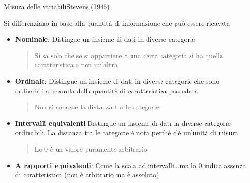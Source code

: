 \documentclass[compress]{beamer}
\begin{document}
\begin{frame}{Misura delle variabili}{Stevens (1946)}
	
	\small
	Si differenziano in base alla quantità di informazione che può essere ricavata
	
	\begin{itemize}
	\item \textbf{Nominale}: Distingue un insieme di dati in diverse categorie
	\begin{quote}
		Si sa solo che se si appartiene a una certa categoria si ha quella caratteristica e non un'altra
	\end{quote}
	\item \textbf{Ordinale}: Distingue un insieme di dati in diverse categorie che sono ordinabili a seconda della quantità di caratteristica posseduta 
	\begin{quote}
		Non si conosce la distanza tra le categorie
	\end{quote}
	\item \textbf{Intervalli equivalenti} Distingue un insieme di dati in diverse categorie ordinabili. La distanza tra le categorie è nota perché c'è un'unità di misura
	\begin{quote}
		Lo 0 è un valore puramente arbitrario
	\end{quote}
	\item \textbf{A rapporti equivalenti}: Come la scala ad intervalli...ma lo 0 indica assenza di caratteristica (non è arbitrario ma è assoluto) 
	\end{itemize}
\end{frame}
\end{document}
